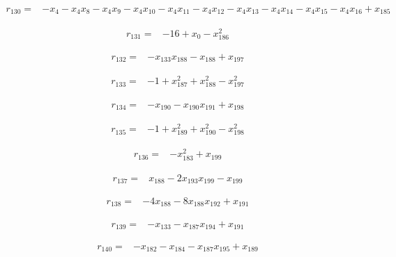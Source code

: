 \begin{align*}
r_{130}={}&-x_{4}-x_{4}x_{8}-x_{4}x_{9}-x_{4}x_{10}-x_{4}x_{11}-x_{4}x_{12}-x_{4}x_{13}-x_{4}x_{14}-x_{4}x_{15}-x_{4}x_{16}+x_{185}
\end{align*}

\begin{align*}
r_{131}={}&-16+x_{0}-x_{186}^{2}
\end{align*}

\begin{align*}
r_{132}={}&-x_{133}x_{188}-x_{188}+x_{197}
\end{align*}

\begin{align*}
r_{133}={}&-1+x_{187}^{2}+x_{188}^{2}-x_{197}^{2}
\end{align*}

\begin{align*}
r_{134}={}&-x_{190}-x_{190}x_{191}+x_{198}
\end{align*}

\begin{align*}
r_{135}={}&-1+x_{189}^{2}+x_{190}^{2}-x_{198}^{2}
\end{align*}

\begin{align*}
r_{136}={}&-x_{183}^{2}+x_{199}
\end{align*}

\begin{align*}
r_{137}={}&x_{188}-2x_{193}x_{199}-x_{199}
\end{align*}

\begin{align*}
r_{138}={}&-4x_{188}-8x_{188}x_{192}+x_{191}
\end{align*}

\begin{align*}
r_{139}={}&-x_{133}-x_{187}x_{194}+x_{191}
\end{align*}

\begin{align*}
r_{140}={}&-x_{182}-x_{184}-x_{187}x_{195}+x_{189}
\end{align*}

